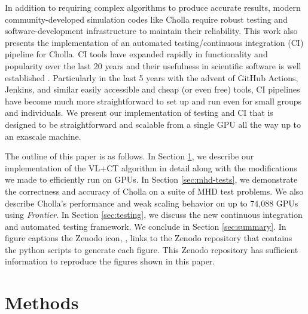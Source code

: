 \documentclass[modern]{aastex631}
\newcommand*{\img}[1]{%
    \raisebox{-.05\baselineskip}{%
        \texttt{[image: \#1]}%
    }%
}
\begin{document}
In addition to requiring complex algorithms to produce accurate results, modern community-developed simulation codes like Cholla require robust testing and software-development infrastructure to maintain their reliability. This work also presents the implementation of an automated testing/continuous integration (CI) pipeline for Cholla. CI tools have expanded rapidly in functionality and popularity over the last 20 years and their usefulness in scientific software is well established \citep{beck_1999, wilson_2014,wilson_2017}. Particularly in the last 5 years with the advent of GitHub Actions, Jenkins, and similar easily accessible and cheap (or even free) tools, CI pipelines have become much more straightforward to set up and run even for small groups and individuals. We present our implementation of testing and CI that is designed to be straightforward and scalable from a single GPU all the way up to an exascale machine.

The outline of this paper is as follows. In Section \ref{sec:methods}, we describe our implementation of the VL+CT algorithm in detail along with the modifications we made to efficiently run on GPUs. In Section \ref{sec:mhd-tests}, we demonstrate the correctness and accuracy of Cholla on a suite of MHD test problems. We also describe Cholla's performance and weak scaling behavior on up to 74,088 GPUs using \textit{Frontier}. In Section \ref{sec:testing}, we discuss the new continuous integration and automated testing framework. We conclude in Section \ref{sec:summary}. In figure captions the Zenodo icon, \img{zenodo-gradient-200.png}, links to the Zenodo repository that contains the python scripts to generate each figure. This Zenodo repository has sufficient information to reproduce the figures shown in this paper.


\section{Methods}
\label{sec:methods}

\end{document}
